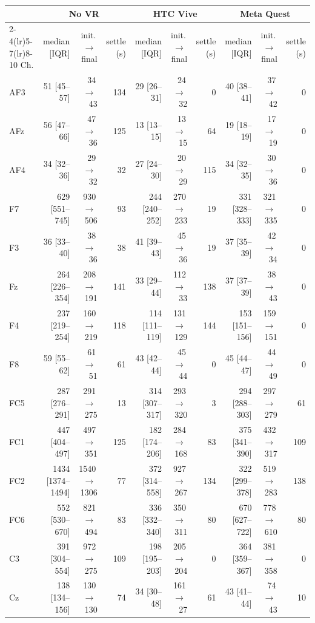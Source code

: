 \begin{tabular}{lrrrrrrrrr}
\toprule
 & \multicolumn{3}{c}{No VR} & \multicolumn{3}{c}{HTC Vive} & \multicolumn{3}{c}{Meta Quest} \\
\cmidrule(lr){2-4}\cmidrule(lr){5-7}\cmidrule(lr){8-10}
Ch. & median [IQR] & init.\,$\to$\,final & settle (s) & median [IQR] & init.\,$\to$\,final & settle (s) & median [IQR] & init.\,$\to$\,final & settle (s) \\
\midrule
AF3 & 51 [45--57] & 34\,$\to$\,43 & 134 & 29 [26--31] & 24\,$\to$\,32 & 0 & 40 [38--41] & 37\,$\to$\,42 & 0 \\
AFz & 56 [47--66] & 47\,$\to$\,36 & 125 & 13 [13--15] & 13\,$\to$\,15 & 64 & 19 [18--19] & 17\,$\to$\,19 & 0 \\
AF4 & 34 [32--36] & 29\,$\to$\,32 & 32 & 27 [24--30] & 20\,$\to$\,29 & 115 & 34 [32--35] & 30\,$\to$\,36 & 0 \\
F7 & 629 [551--745] & 930\,$\to$\,506 & 93 & 244 [240--252] & 270\,$\to$\,233 & 19 & 331 [328--333] & 321\,$\to$\,335 & 0 \\
F3 & 36 [33--40] & 38\,$\to$\,36 & 38 & 41 [39--43] & 45\,$\to$\,36 & 19 & 37 [35--39] & 42\,$\to$\,34 & 0 \\
Fz & 264 [226--354] & 208\,$\to$\,191 & 141 & 33 [29--44] & 112\,$\to$\,33 & 138 & 37 [37--39] & 38\,$\to$\,43 & 0 \\
F4 & 237 [219--254] & 160\,$\to$\,219 & 118 & 114 [111--119] & 131\,$\to$\,129 & 144 & 153 [151--156] & 159\,$\to$\,151 & 0 \\
F8 & 59 [55--62] & 61\,$\to$\,51 & 61 & 43 [42--44] & 45\,$\to$\,44 & 0 & 45 [44--47] & 44\,$\to$\,49 & 0 \\
FC5 & 287 [276--291] & 291\,$\to$\,275 & 13 & 314 [307--317] & 293\,$\to$\,320 & 3 & 294 [288--303] & 297\,$\to$\,279 & 61 \\
FC1 & 447 [404--497] & 497\,$\to$\,351 & 125 & 182 [174--206] & 284\,$\to$\,168 & 83 & 375 [341--390] & 432\,$\to$\,317 & 109 \\
FC2 & 1434 [1374--1494] & 1540\,$\to$\,1306 & 77 & 372 [314--558] & 927\,$\to$\,267 & 134 & 322 [299--378] & 519\,$\to$\,283 & 138 \\
FC6 & 552 [530--670] & 821\,$\to$\,494 & 83 & 336 [332--340] & 350\,$\to$\,311 & 80 & 670 [627--722] & 778\,$\to$\,610 & 80 \\
C3 & 391 [304--554] & 972\,$\to$\,275 & 109 & 198 [195--203] & 205\,$\to$\,204 & 0 & 364 [359--367] & 381\,$\to$\,358 & 0 \\
Cz & 138 [134--156] & 130\,$\to$\,130 & 74 & 34 [30--48] & 161\,$\to$\,27 & 61 & 43 [41--44] & 74\,$\to$\,43 & 10 \\

\end{tabular}
